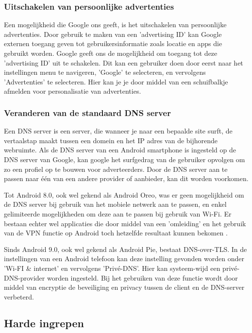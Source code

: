 \subsubsection{Uitschakelen van persoonlijke advertenties}
Een mogelijkheid die Google ons geeft, is het uitschakelen van persoonlijke advertenties. Door gebruik te maken van een 'advertising ID' kan Google externen toegang geven tot gebruikersinformatie zoals locatie en apps die gebruikt worden. Google geeft ons de mogelijkheid om toegang tot deze 'advertising ID' uit te schakelen. Dit kan een gebruiker doen door eerst naar het instellingen menu te navigeren, 'Google' te selecteren, en vervolgens 'Advertenties' te selecteren. Hier kan je je door middel van een schuifbalkje afmelden voor personalisatie van advertenties. \autocite{knight_degoogle}

\subsubsection{Veranderen van de standaard DNS server}
Een DNS server is een server, die wanneer je naar een bepaalde site surft, de vertaalstap maakt tussen een domein en het IP adres van de bijhorende webruimte. Als de DNS server van een Android smartphone is ingesteld op de DNS server van Google, kan google het surfgedrag van de gebruiker opvolgen om zo een profiel op te bouwen voor adverteerders. Door de DNS server aan te passen naar één van een andere provider of aanbieder, kan dit worden voorkomen.

Tot Android 8.0, ook wel gekend als Android Oreo, was er geen mogelijkheid om de DNS server bij gebruik van het mobiele netwerk aan te passen, en enkel gelimiteerde mogelijkheden om deze aan te passen bij gebruik van Wi-Fi. Er bestaan echter wel applicaties die door middel van een 'omleiding' en het gebruik van de VPN functie op Android toch hetzelfde resultaat kunnen bekomen \autocite{knight_degoogle}. 

Sinds Android 9.0, ook wel gekend als Android Pie, bestaat DNS-over-TLS. In de instellingen van een Android telefoon kan deze instelling gevonden worden onder 'Wi-FI \& internet' en vervolgens 'Privé-DNS'. Hier kan systeem-wijd een privé-DNS-provider worden ingesteld. Bij het gebruiken van deze functie wordt door middel van encryptie de beveiliging en privacy tussen de client en de DNS-server verbeterd. \autocite{google_dns-tls}

\subsection{Harde ingrepen}

